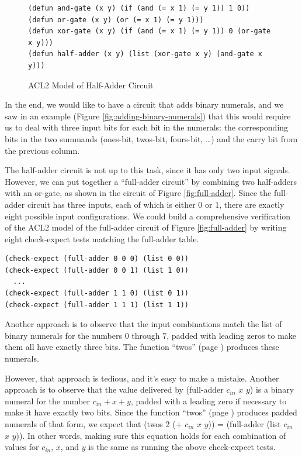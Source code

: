 \begin{figure}
\begin{Verbatim}
(defun and-gate (x y) (if (and (= x 1) (= y 1)) 1 0))
(defun or-gate (x y) (or (= x 1) (= y 1)))
(defun xor-gate (x y) (if (and (= x 1) (= y 1)) 0 (or-gate x y)))
(defun half-adder (x y) (list (xor-gate x y) (and-gate x y)))
\end{Verbatim}
\caption{ACL2 Model of Half-Adder Circuit}
\label{fig:half-adder-acl2}
\end{figure}

In the end, we would like to have a circuit
that adds binary numerals,
and we saw in an example (Figure \ref{fig:adding-binary-numerals})
that this would require us to deal with three input bits
for each bit in the numerals:
the corresponding bits in the two summands (ones-bit, twos-bit,
fours-bit, \dots) and the carry bit from the previous column.

The half-adder circuit is not up to this task,
since it has only two input signals.
However, we can put together a ``full-adder circuit''
by combining two half-adders with an or-gate,
as shown in the circuit of Figure \ref{fig:full-adder}.
Since the full-adder circuit has three inputs,
each of which is either 0 or 1,
there are exactly eight possible input configurations.
We could build a comprehensive verification of
the ACL2 model of the full-adder
circuit of Figure \ref{fig:full-adder} by writing
eight check-expect tests matching the full-adder table.

\begin{Verbatim}
(check-expect (full-adder 0 0 0) (list 0 0))
(check-expect (full-adder 0 0 1) (list 1 0))
  ...
(check-expect (full-adder 1 1 0) (list 0 1))
(check-expect (full-adder 1 1 1) (list 1 1))
\end{Verbatim}

Another approach is to observe
that the input combinations
match the list of binary numerals for the numbers 0 through 7,
padded with leading zeros to make them all have exactly three bits.
The function ``twos'' (page \pageref{twos-defun}) produces these numerals.

However, that approach is tedious, and it's easy to make a mistake.
Another approach is to observe that
the value delivered by (full-adder $c_{in}$ $x$ $y$)
is a binary numeral for the number $c_{in} + x + y$,
padded with a leading zero if necessary to make it have exactly two bits.
Since the function ``twos'' (page \pageref{twos-defun}) produces padded
numerals of that form, we expect that
(twos 2 (+ $c_{in}$ $x$ $y$)) = (full-adder (list $c_{in}$ $x$ $y$)).
In other words, making sure this equation holds
for each combination of values for $c_{in}$, $x$, and $y$
is the same as running the above check-expect tests.


